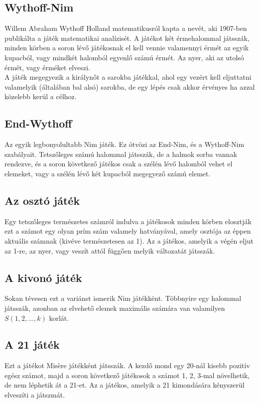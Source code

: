 \subsection{Wythoff-Nim}
Willem Abraham Wythoff Holland matematikusról kapta a nevét, aki 1907-ben publikálta a játék matematikai analízisét. A játékot két érmehalommal játsszák, minden körben a soron lévő játékosnak el kell vennie valamennyi érmét az egyik kupacból, vagy mindkét halomból egyenlő számú érmét. Az nyer, aki az utolsó érmét, vagy érméket elveszi. \\
A játék megegyezik a királynőt a sarokba játékkal, ahol egy vezért kell eljuttatni valamelyik (általában bal alsó) sarokba, de egy lépés csak akkor érvényes ha azzal közelebb kerül a célhoz.

\subsection{End-Wythoff}
Az egyik legbonyolultabb Nim játék. Ez ötvözi az End-Nim, és a Wythoff-Nim szabályait. Tetszőleges számú halommal játsszák, de a halmok sorba vannak rendezve, és a soron következő játékos csak a szélén lévő halomból vehet el elemeket, vagy a szélén lévő két kupacból megegyező számú elemet.

\subsection{Az osztó játék}
Egy tetszőleges természetes számról indulva a játékosok minden körben elosztják ezt a számot egy olyan prím szám valamely hatványával, amely osztója az éppen aktuális számnak (kivéve természetesen az 1). Az a játékos, amelyik a végén eljut az 1-re, az nyer, vagy veszít attól függően melyik változatát játsszák.

\subsection{A kivonó játék}
Sokan tévesen ezt a variánst ismerik Nim játékként. Többnyire egy halommal játsszák, azonban az elvehető elemek maximális számára van valamilyen $S(1, 2, ..., k)$ korlát.

\subsection{A 21 játék}
Ezt a játékot Misère játékként játsszák. A kezdő mond egy 20-nál kisebb pozitív egész számot, majd a soron következő játékosok a számot 1, 2, 3-mal növelhetik, de nem léphetik át a 21-et. Az a játékos, amelyik a 21 kimondására kényszerül elveszíti a játszmát.

